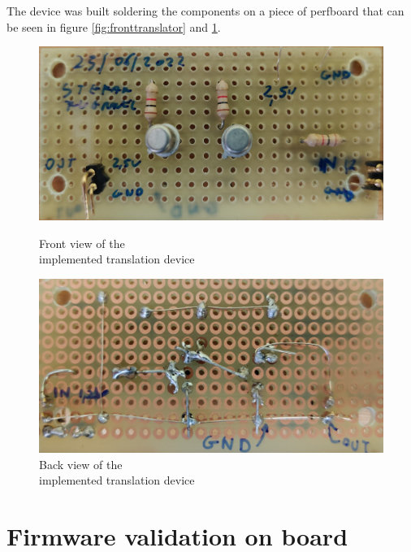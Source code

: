 \noindent The device was built soldering the components on a piece of perfboard that can be seen in figure \ref{fig:fronttranslator} and \ref{fig:backtranslator}.
\begin{figure}[H]
	\centering
	\begin{minipage}{.5\textwidth}
		\centering
		\includegraphics[width=.99\linewidth]{IMG/ch5/FRONTTRANSLATOR}
		\caption{Front view of the \\implemented translation device}
		\label{fig:fronttranslator}
	\end{minipage}%
	\begin{minipage}{.5\textwidth}
		\centering
		\includegraphics[width=.99\linewidth]{IMG/ch5/BACKTRANSLATOR}
		\caption{Back view of the \\implemented translation device}
		\label{fig:backtranslator}
	\end{minipage}
\end{figure}
\section{Firmware validation on board}

